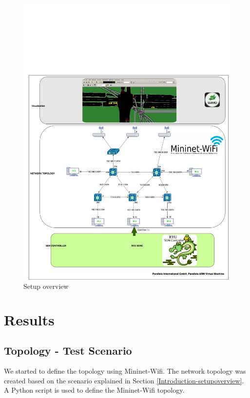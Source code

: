 \documentclass[
  oneside,
  11pt, a4paper,
  footinclude=true,
  headinclude=true,
  cleardoublepage=empty
]{scrbook}
\begin{document}
\begin{figure}[H]
\begin{center}
  \includegraphics[width=1\textwidth]{img/setupcenario.png}
\end{center}
  \caption{Setup overview}
  \centering  
  \label{setup-overview}
\end{figure}






\section{Results}

\subsection{Topology - Test Scenario}

We started to define the topology using Mininet-Wifi. The network topology was created based on the scenario explained in Section \ref{Introduction-setupoverview}. A Python script is used to define the Mininet-Wifi topology.
\end{document}
